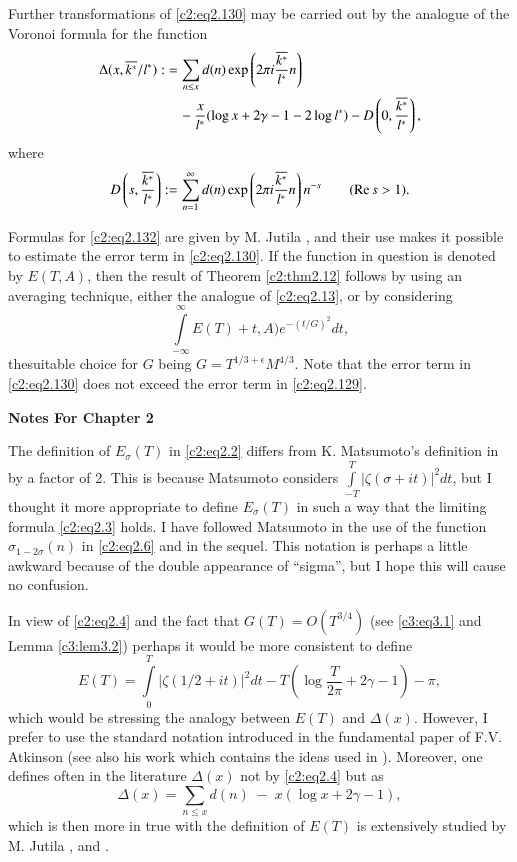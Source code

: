 Further transformations of \eqref{c2:eq2.130} may be carried out by
the analogue of the Voronoi formula for the function
\begin{align}
   \Delta  (x, \overline{k^*}/l^*): &= \sum_{n \leq x} d(n) \exp \left(2 \pi
  i \frac{\overline{k^*}}{l^*}n \right)\notag\\ 
  &\quad - \frac{x}{l^*} (\log x + 2 \gamma
  -1 - 2 \log l^*) - D\left(0, \frac{\overline{k^*}}{l^*}
  \right),\label{c2:eq2.132} 
\end{align}
where
$$
D\left(s, \frac{\overline{k^*}}{l^*} \right): = \sum_{n=1}^\infty d(n) \exp
\left(2 \pi i \frac{\overline{k^*}}{l^*} n \right)n^{-s} \qquad (\operatorname{Re} s> 1).
$$

Formulas for \eqref{c2:eq2.132} are given by M. Jutila \cite{Jutila9}, and
their use makes it possible to estimate the error term in
\eqref{c2:eq2.130}. If the function in question is denoted by $E(T,
A)$, then the result of Theorem \ref{c2:thm2.12} follows by using an
averaging technique, either the analogue of \eqref{c2:eq2.13}, or by
considering 
$$
\int\limits_{- \infty}^\infty E(T) + t, A) e^{- (t/G)^2}dt,
$$
the\pageoriginale suitable choice for $G$ being $G=
T^{1/3+\epsilon}M^{4/3}$. Note that the error term in
\eqref{c2:eq2.130} does not exceed the error term in
\eqref{c2:eq2.129}. 

\newpage

\begin{center}
  \textbf{\LARGE Notes For Chapter 2}
\end{center}
\bigskip

The definition of $E_\sigma (T)$ in \eqref{c2:eq2.2} differs from
K. Matsumoto's definition in \cite{Matsumoto1} by a factor of 2. This is
because Matsumoto considers $\displaystyle{\int\limits_{-T}^T |\zeta
  (\sigma + it)|^2} dt$, but I thought it more appropriate to define
$E_\sigma (T)$ in such a way that the limiting formula
\eqref{c2:eq2.3} holds. I have followed Matsumoto in the use of the
function $\sigma_{1- 2 \sigma}(n)$ in \eqref{c2:eq2.6} and in the
sequel. This notation is perhaps a little awkward because of the
double appearance of ``sigma'', but I hope this will cause no
confusion. 

In view of \eqref{c2:eq2.4} and the fact that $G(T)=O (T^{3/4})$ (see
\eqref{c3:eq3.1} and Lemma \ref{c3:lem3.2}) perhaps it would be more
consistent to define
$$ 
E(T) = \int\limits_{0}^T |\zeta (1/2 + it)|^2 dt - T \left(\log
\frac{T}{2 \pi} + 2 \gamma -1 \right)- \pi,
$$
which would be stressing the analogy between $E(T)$ and $\Delta 
(x)$. However, I prefer to use the standard notation introduced in the
fundamental paper of F.V. Atkinson \cite{Atkinson2} (see also his work
\cite{Atkinson3} which contains the ideas used in \cite{Atkinson2}). Moreover, one
defines often in the literature $\Delta  (x)$ not by
\eqref{c2:eq2.4} but as
$$
\Delta  (x) = \sum_{n \leq x} d(n) \; - \;  x(\log x + 2 \gamma -1),
$$
which is then more in true with the definition of $E(T)$ is extensively
studied by M. Jutila \cite{Jutila1}, \cite{Jutila4} and \cite{Jutila5}.

